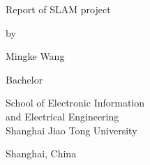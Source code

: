 \begin{titlepage}
  \vspace*{\fill}

  \begin{center}
    {\Huge Report of SLAM project \par
    }

    \bigskip%
    by

    \bigskip%
    Mingke Wang


    \bigskip\bigskip\bigskip\bigskip%

    \bigskip%

    \bigskip%
    Bachelor


    \bigskip\bigskip\bigskip\bigskip%

    \bigskip\bigskip%
    School of Electronic Information\\
    and Electrical Engineering\\


    \bigskip\bigskip\bigskip\bigskip%
    Shanghai Jiao Tong University

    \bigskip%
    Shanghai, China


    \bigskip\bigskip\bigskip{}
  \end{center}

  \vspace*{\fill}
\end{titlepage}